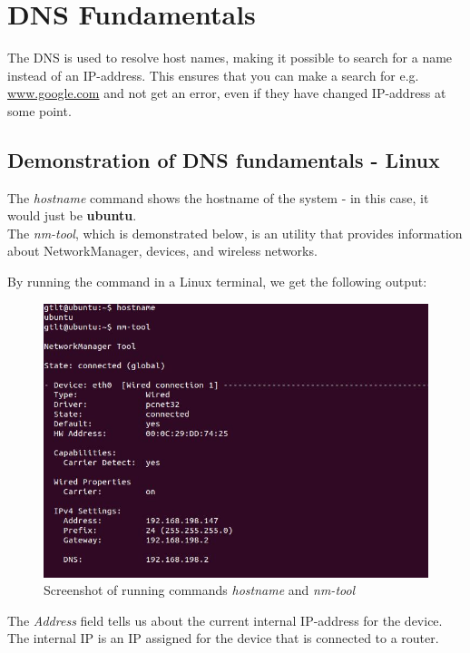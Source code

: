\section{DNS Fundamentals}

The DNS is used to resolve host names, making it possible to search for a name instead of an IP-address. This ensures that you can make a search for e.g. \url{www.google.com} and not get an error, even if they have changed IP-address at some point.

\subsection{Demonstration of DNS fundamentals - Linux}

The \textit{hostname} command shows the hostname of the system - in this case, it would just be \textbf{ubuntu}.\\

The \textit{nm-tool}, which is demonstrated below, is an utility that provides information about NetworkManager, devices, and wireless networks.

By running the command in a Linux terminal, we get the following output:

\begin{figure}[ht!]
\centering
\includegraphics[width=150mm]{img/nm-tool.png}
\caption{Screenshot of running commands \textit{hostname} and \textit{nm-tool}}
\label{nm-tool}
\end{figure}

The \textit{Address} field tells us about the current internal IP-address for the device. The internal IP is an IP assigned for the device that is connected to a router. \\

